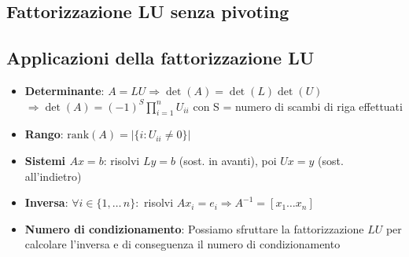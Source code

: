 \documentclass[12pt,a4paper]{article}
\begin{document}
\vspace{1em}

\subsection*{Fattorizzazione LU senza pivoting}

\begin{flushleft}
\end{flushleft}

\subsection*{Applicazioni della fattorizzazione LU}

\begin{itemize}
\item \textbf{Determinante}: $A = LU \Rightarrow\det(A) = \det(L)\det(U)$ $\Rightarrow \det(A) = (-1)^S\prod_{i=1}^n U_{ii}$ con S = numero di scambi di riga effettuati
\item \textbf{Rango}: $\mathrm{rank}(A) = |\{i : U_{ii} \neq 0\}|$
\item \textbf{Sistemi $Ax = b$}: risolvi $Ly = b$ (sost. in avanti), poi $Ux = y$ (sost. all'indietro)
\item \textbf{Inversa}: $\forall i \in \{1,\dots\,n\}:$ risolvi $Ax_i = e_i \Rightarrow A^{-1} = [x_1 \dots x_n]$
\item \textbf{Numero di condizionamento}: Possiamo sfruttare la fattorizzazione $LU$ per calcolare l'inversa e di conseguenza il numero di condizionamento
\end{itemize}
\end{document}

